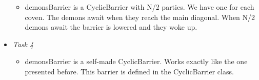 \documentclass[14pt]{article}
\begin{document}
\begin{itemize}
            \begin{itemize}
                \item demonsBarrier is a CyclicBarrier with N/2 parties. We have one for each coven. The demons await when they reach the main diagonal. When N/2 demons await the barrier is lowered and they woke up.
            \end{itemize}
            \item \textit{Task 4}\\
            \begin{itemize}
                \item demonsBarrier is a self-made CyclicBarrier. Works exactly like the one presented before. This barrier is defined in the CyclicBarrier class.
            \end{itemize}
\end{itemize}
\end{document}
